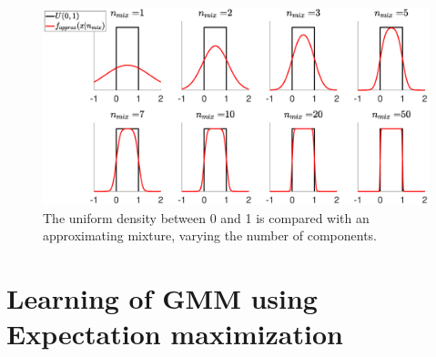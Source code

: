 \documentclass{article}
\begin{document}
\begin{figure}
	\centering
	\includegraphics[width=0.99 \columnwidth]{./image/f_approx.eps}
	\caption{The uniform density between 0 and 1 is compared with an approximating mixture, varying the number of components.}
	\label{fig:f_approx}
\end{figure} 

\section{Learning of GMM using Expectation maximization}
\end{document}
